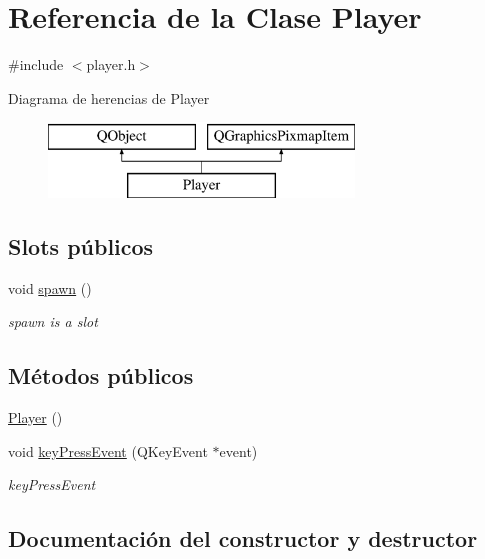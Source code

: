 \hypertarget{class_player}{}\section{Referencia de la Clase Player}
\label{class_player}


{\ttfamily \#include $<$player.\+h$>$}

Diagrama de herencias de Player\begin{figure}[H]
\begin{center}
\leavevmode
\includegraphics[height=2.000000cm]{class_player}
\end{center}
\end{figure}
\subsection*{Slots públicos}
\begin{DoxyCompactItemize}
\item 
void \hyperlink{class_player_a59ae3f2c7151032a85e58b1591cad769}{spawn} ()
\begin{DoxyCompactList}\small\item\em spawn is a slot \end{DoxyCompactList}\end{DoxyCompactItemize}
\subsection*{Métodos públicos}
\begin{DoxyCompactItemize}
\item 
\hyperlink{class_player_affe0cc3cb714f6deb4e62f0c0d3f1fd8}{Player} ()
\item 
void \hyperlink{class_player_a4d269c4118c29b0ee85c1e0f674260ee}{key\+Press\+Event} (Q\+Key\+Event $\ast$event)
\begin{DoxyCompactList}\small\item\em key\+Press\+Event \end{DoxyCompactList}\end{DoxyCompactItemize}


\subsection{Documentación del constructor y destructor}
\hypertarget{class_player_affe0cc3cb714f6deb4e62f0c0d3f1fd8}{}\label{class_player_affe0cc3cb714f6deb4e62f0c0d3f1fd8} 
